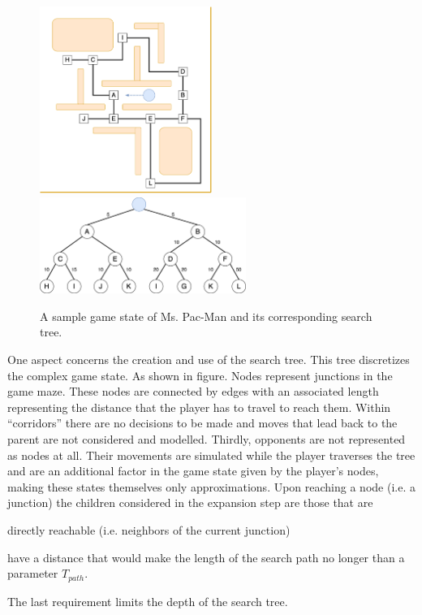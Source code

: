 \begin{figure}[htbp]
    \centering
    \includegraphics[width=0.5\textwidth]{img/mspacman.png}\\
    \vspace*{0.7cm}
    \includegraphics[width=0.6\textwidth]{img/mspacman-tree.png}
    \caption{A sample game state of Ms. Pac-Man and its corresponding search tree.}
    \label{fig:mspacman}
\end{figure}
One aspect concerns the creation and use of the search tree. This tree discretizes the complex game state. As shown in figure. Nodes represent junctions in the game maze. These nodes are connected by edges with an associated length representing the distance that the player has to travel to reach them. Within \enquote{corridors} there are no decisions to be made and moves that lead back to the parent are not considered and modelled. Thirdly, opponents are not represented as nodes at all. Their movements are simulated while the player traverses the tree and are an additional factor in the game state given by the player's nodes, making these states themselves only approximations. Upon reaching a node (i.e. a junction) the children considered in the expansion step are those that are \begin{enumerate*}[label=\roman*)]
    \item directly reachable (i.e. neighbors of the current junction)
    \item have a distance that would make the length of the search path no longer than a parameter $T_{path}$.
\end{enumerate*} The last requirement limits the depth of the search tree.

